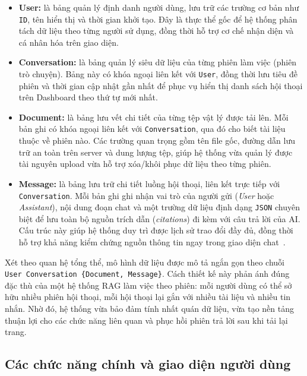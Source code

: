 \documentclass[10pt, conference, a4paper, compsocconf]{IEEEtran}
\begin{document}
\begin{itemize}
  \item \textbf{User:} là bảng quản lý định danh người dùng, lưu trữ các trường cơ bản như \texttt{ID}, tên hiển thị và thời gian khởi tạo. Đây là thực thể gốc để hệ thống phân tách dữ liệu theo từng người sử dụng, đồng thời hỗ trợ cơ chế nhận diện và cá nhân hóa trên giao diện.
  \item \textbf{Conversation:} là bảng quản lý siêu dữ liệu của từng phiên làm việc (phiên trò chuyện). Bảng này có khóa ngoại liên kết với \texttt{User}, đồng thời lưu tiêu đề phiên và thời gian cập nhật gần nhất để phục vụ hiển thị danh sách hội thoại trên Dashboard theo thứ tự mới nhất.
  \item \textbf{Document:} là bảng lưu vết chi tiết của từng tệp vật lý được tải lên. Mỗi bản ghi có khóa ngoại liên kết với \texttt{Conversation}, qua đó cho biết tài liệu thuộc về phiên nào. Các trường quan trọng gồm tên file gốc, đường dẫn lưu trữ an toàn trên server và dung lượng tệp, giúp hệ thống vừa quản lý được tài nguyên upload vừa hỗ trợ xóa/khôi phục dữ liệu theo từng phiên.
  \item \textbf{Message:} là bảng lưu trữ chi tiết luồng hội thoại, liên kết trực tiếp với \texttt{Conversation}. Mỗi bản ghi ghi nhận vai trò của người gửi (\textit{User} hoặc \textit{Assistant}), nội dung đoạn chat và một trường dữ liệu định dạng \texttt{JSON} chuyên biệt để lưu toàn bộ nguồn trích dẫn (\textit{citations}) đi kèm với câu trả lời của AI. Cấu trúc này giúp hệ thống duy trì được lịch sử trao đổi đầy đủ, đồng thời hỗ trợ khả năng kiểm chứng nguồn thông tin ngay trong giao diện chat~\cite{smartdoc-source}.
\end{itemize}

\vspace{1 em}
Xét theo quan hệ tổng thể, mô hình dữ liệu được mô tả ngắn gọn theo chuỗi \texttt{User \textrightarrow Conversation \textrightarrow \{Document, Message\}}. Cách thiết kế này phản ánh đúng đặc thù của một hệ thống RAG làm việc theo phiên: mỗi người dùng có thể sở hữu nhiều phiên hội thoại, mỗi hội thoại lại gắn với nhiều tài liệu và nhiều tin nhắn. Nhờ đó, hệ thống vừa bảo đảm tính nhất quán dữ liệu, vừa tạo nền tảng thuận lợi cho các chức năng liên quan và phục hồi phiên trả lời sau khi tải lại trang.

\subsection{Các chức năng chính và giao diện người dùng}
\end{document}
